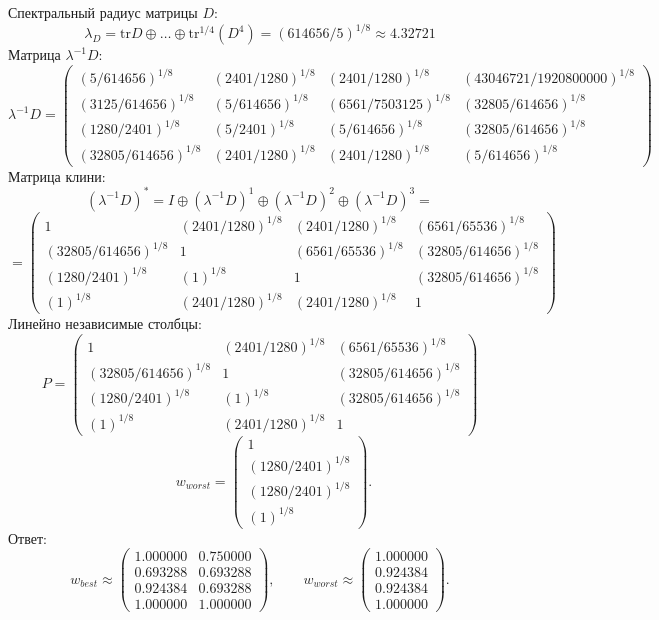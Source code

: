 Спектральный радиус матрицы $D$:
$$\lambda_{D} = \mathrm{tr}D\oplus \dots \oplus \mathrm{tr}^{1/4}(D^{4}) = (614656/5)^{1/8} \approx 4.32721$$
Матрица $\lambda^{-1}D$:
$$\lambda^{-1}D = \begin{pmatrix}
(5/614656)^{1/8} & (2401/1280)^{1/8} & (2401/1280)^{1/8} & (43046721/1920800000)^{1/8}\\
(3125/614656)^{1/8} & (5/614656)^{1/8} & (6561/7503125)^{1/8} & (32805/614656)^{1/8}\\
(1280/2401)^{1/8} & (5/2401)^{1/8} & (5/614656)^{1/8} & (32805/614656)^{1/8}\\
(32805/614656)^{1/8} & (2401/1280)^{1/8} & (2401/1280)^{1/8} & (5/614656)^{1/8}
\end{pmatrix}
$$
Матрица клини:
$$(\lambda^{-1}D)^* = I \oplus (\lambda^{-1}D)^1 \oplus (\lambda^{-1}D)^2 \oplus (\lambda^{-1}D)^3 = $$
$$ = \begin{pmatrix}
1 & (2401/1280)^{1/8} & (2401/1280)^{1/8} & (6561/65536)^{1/8}\\
(32805/614656)^{1/8} & 1 & (6561/65536)^{1/8} & (32805/614656)^{1/8}\\
(1280/2401)^{1/8} & (1)^{1/8} & 1 & (32805/614656)^{1/8}\\
(1)^{1/8} & (2401/1280)^{1/8} & (2401/1280)^{1/8} & 1
\end{pmatrix}
$$
Линейно независимые столбцы:
$$P = \begin{pmatrix}
1 & (2401/1280)^{1/8} & (6561/65536)^{1/8}\\
(32805/614656)^{1/8} & 1 & (32805/614656)^{1/8}\\
(1280/2401)^{1/8} & (1)^{1/8} & (32805/614656)^{1/8}\\
(1)^{1/8} & (2401/1280)^{1/8} & 1
\end{pmatrix}
$$
$$
\qquad w_{worst} = \begin{pmatrix}
1\\
(1280/2401)^{1/8}\\
(1280/2401)^{1/8}\\
(1)^{1/8}
\end{pmatrix}.
$$
Ответ:
$$w_{best} \approx \begin{pmatrix}
1.000000 & 0.750000\\
0.693288 & 0.693288\\
0.924384 & 0.693288\\
1.000000 & 1.000000
\end{pmatrix},
\qquad
w_{worst} \approx \begin{pmatrix}
1.000000\\
0.924384\\
0.924384\\
1.000000
\end{pmatrix}.
$$

